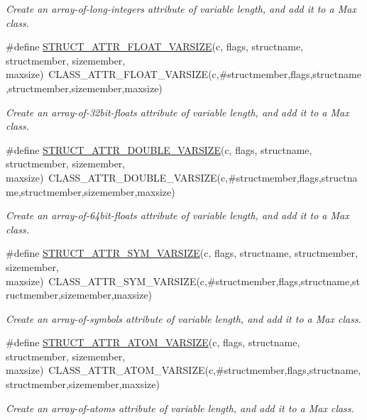 \begin{DoxyCompactItemize}
\begin{DoxyCompactList}\small\item\em Create an array-\/of-\/long-\/integers attribute of variable length, and add it to a Max class. \item\end{DoxyCompactList}\item 
\#define \hyperlink{group__attr_gaa9db44ae526e5a641ef33158d2c62098}{STRUCT\_\-ATTR\_\-FLOAT\_\-VARSIZE}(c, flags, structname, structmember, sizemember, maxsize)~CLASS\_\-ATTR\_\-FLOAT\_\-VARSIZE(c,\#structmember,flags,structname,structmember,sizemember,maxsize)
\begin{DoxyCompactList}\small\item\em Create an array-\/of-\/32bit-\/floats attribute of variable length, and add it to a Max class. \item\end{DoxyCompactList}\item 
\#define \hyperlink{group__attr_ga4c090b96f117ce8843af9d9ffba29f8d}{STRUCT\_\-ATTR\_\-DOUBLE\_\-VARSIZE}(c, flags, structname, structmember, sizemember, maxsize)~CLASS\_\-ATTR\_\-DOUBLE\_\-VARSIZE(c,\#structmember,flags,structname,structmember,sizemember,maxsize)
\begin{DoxyCompactList}\small\item\em Create an array-\/of-\/64bit-\/floats attribute of variable length, and add it to a Max class. \item\end{DoxyCompactList}\item 
\#define \hyperlink{group__attr_gafd8c39b5fa81d7ef014ca6292cc8e0d5}{STRUCT\_\-ATTR\_\-SYM\_\-VARSIZE}(c, flags, structname, structmember, sizemember, maxsize)~CLASS\_\-ATTR\_\-SYM\_\-VARSIZE(c,\#structmember,flags,structname,structmember,sizemember,maxsize)
\begin{DoxyCompactList}\small\item\em Create an array-\/of-\/symbols attribute of variable length, and add it to a Max class. \item\end{DoxyCompactList}\item 
\#define \hyperlink{group__attr_gab119784ef725f2f192877fd3acd5701a}{STRUCT\_\-ATTR\_\-ATOM\_\-VARSIZE}(c, flags, structname, structmember, sizemember, maxsize)~CLASS\_\-ATTR\_\-ATOM\_\-VARSIZE(c,\#structmember,flags,structname,structmember,sizemember,maxsize)
\begin{DoxyCompactList}\small\item\em Create an array-\/of-\/atoms attribute of variable length, and add it to a Max class. \item\end{DoxyCompactList}\item 

\end{DoxyCompactItemize}
